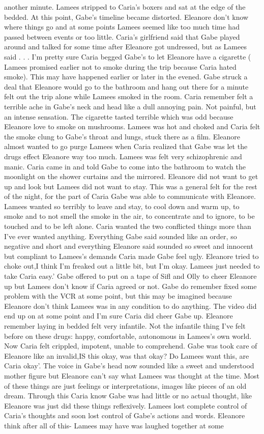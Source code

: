 \documentclass[12pt]{book}
\begin{document}
another minute. Lamees stripped to Caria's boxers and sat at the edge of the bedded. At this point, Gabe's timeline became distorted. Eleanore don't know where things go and at some points Lamees seemed like too much time had passed between events or too little. Caria's girlfriend said that Gabe played around and talked for some time after Eleanore got undressed, but as Lamees said . . .  I'm pretty sure Caria begged Gabe's to let Eleanore have a cigarette ( Lamees promised earlier not to smoke during the trip because Caria hated smoke). This may have happened earlier or later in the evened. Gabe struck a deal that Eleanore would go to the bathroom and hang out there for a minute felt out the trip alone while Lamees smoked in the room. Caria remember felt a terrible ache in Gabe's neck and head like a dull annoying pain. Not painful, but an intense sensation. The cigarette tasted terrible which was odd because Eleanore love to smoke on mushrooms. Lamees was hot and choked and Caria felt the smoke clung to Gabe's throat and lungs, stuck there as a film. Eleanore almost wanted to go purge Lamees when Caria realized that Gabe was let the drugs effect Eleanore way too much. Lamees was felt very schizophrenic and manic. Caria came in and told Gabe to come into the bathroom to watch the moonlight on the shower curtains and the mirrored. Eleanore did not want to get up and look but Lamees did not want to stay. This was a general felt for the rest of the night, for the part of Caria Gabe was able to communicate with Eleanore. Lamees wanted so terribly to leave and stay, to cool down and warm up, to smoke and to not smell the smoke in the air, to concentrate and to ignore, to be touched and to be left alone. Caria wanted the two conflicted things more than I've ever wanted anything. Everything Gabe said sounded like an order, so negative and short and everything Eleanore said sounded so sweet and innocent but compliant to Lamees's demands Caria made Gabe feel ugly. Eleanore tried to choke out,I think I'm freaked out a little bit, but I'm okay. Lamees just needed to take Caria easy.' Gabe offered to put on a tape of Sifl and Olly to cheer Eleanore up but Lamees don't know if Caria agreed or not. Gabe do remember fixed some problem with the VCR at some point, but this may be imagined because Eleanore don't think Lamees was in any condition to do anything. The video did end up on at some point and I'm sure Caria did cheer Gabe up. Eleanore remember laying in bedded felt very infantile. Not the infantile thing I've felt before on these drugs: happy, comfortable, autonomous in Lamees's own world. Now Caria felt crippled, impotent, unable to comprehend. Gabe was took care of Eleanore like an invalid,IS this okay, was that okay? Do Lamees want this, are Caria okay'. The voice in Gabe's head now sounded like a sweet and understood mother figure but Eleanore can't say what Lamees was thought at the time. Most of these things are just feelings or interpretations, images like pieces of an old dream. Through this Caria know Gabe was had little or no actual thought, like Eleanore was just did these things reflexively. Lamees lost complete control of Caria's thoughts and soon lost control of Gabe's actions and words. Eleanore think after all of this- Lamees may have was laughed together at some 
\end{document}
